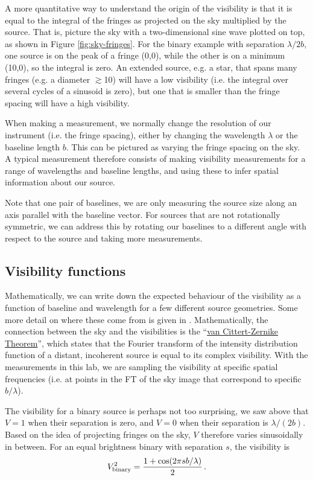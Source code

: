 \documentclass[11pt]{article}
\begin{document}
A more quantitative way to understand the origin of the visibility is that it is equal to the integral of the fringes as projected on the sky multiplied by the source. That is, picture the sky with a two-dimensional sine wave plotted on top, as shown in Figure \ref{fig:sky-fringes}. For the binary example with separation $\lambda/2b$, one source is on the peak of a fringe (0,0), while the other is on a minimum (10,0), so the integral is zero. An extended source, e.g. a star, that spans many fringes (e.g. a diameter $\gtrsim$10) will have a low visibility (i.e. the integral over several cycles of a sinusoid is zero), but one that is smaller than the fringe spacing will have a high visibility.

When making a measurement, we normally change the resolution of our instrument (i.e. the fringe spacing), either by changing the wavelength $\lambda$ or the baseline length $b$. This can be pictured as varying the fringe spacing on the sky. A typical measurement therefore consists of making visibility measurements for a range of wavelengths and baseline lengths, and using these to infer spatial information about our source.

Note that one pair of baselines, we are only measuring the source size along an axis parallel with the baseline vector. For sources that are not rotationally symmetric, we can address this by rotating our baselines to a different angle with respect to the source and taking more measurements.

\subsection{Visibility functions}

Mathematically, we can write down the expected behaviour of the visibility as a function of baseline and wavelength for a few different source geometries. Some more detail on where these come from is given in \citet[][e.g. Fig 2.13]{2011psi..book.....G}. Mathematically, the connection between the sky and the visibilities is the ``\href{https://en.wikipedia.org/wiki/Van_Cittert%E2%80%93Zernike_theorem}{van Cittert-Zernike Theorem}'', which states that the Fourier transform of the intensity distribution function of a distant, incoherent source is equal to its complex visibility. With the measurements in this lab, we are sampling the visibility at specific spatial frequencies (i.e. at points in the FT of the sky image that correspond to specific $b/\lambda$).

The visibility for a binary source is perhaps not too surprising, we saw above that $V=1$ when their separation is zero, and $V=0$ when their separation is $\lambda/(2b)$. Based on the idea of projecting fringes on the sky, $V$ therefore varies sinusoidally in between. For an equal brightness binary with separation $s$, the visibility is
\begin{equation}
    V^2_{\rm binary} = \frac{1 + \cos ( 2 \pi s b / \lambda )}{2} \, .
\end{equation}
\end{document}
